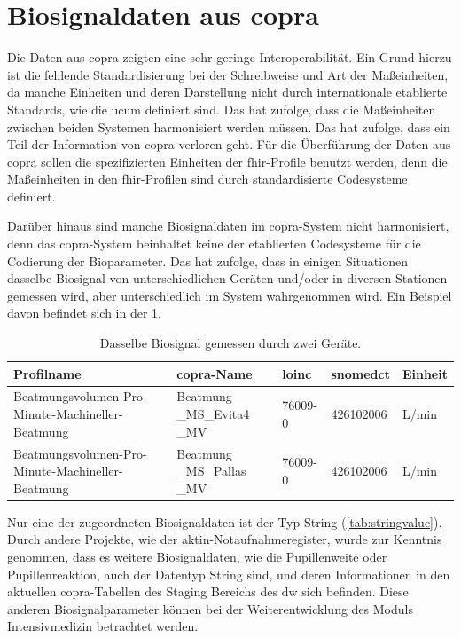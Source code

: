 \section{Biosignaldaten aus \acs{copra}} \label{sec:configvarcopradiscu}

Die Daten aus \ac{copra} zeigten eine sehr geringe Interoperabilität. Ein Grund hierzu ist die fehlende Standardisierung bei der Schreibweise und Art der Maßeinheiten, da manche Einheiten und deren Darstellung nicht durch internationale etablierte Standards, wie die \ac{ucum} definiert sind. Das hat zufolge, dass die Maßeinheiten zwischen beiden Systemen harmonisiert werden müssen. Das hat zufolge, dass ein Teil der Information von \ac{copra} verloren geht. Für die Überführung der Daten aus \ac{copra} sollen die spezifizierten Einheiten der \ac{fhir}-Profile benutzt werden, denn die Maßeinheiten in den \ac{fhir}-Profilen sind durch standardisierte Codesysteme definiert.

Darüber hinaus sind manche Biosignaldaten im \ac{copra}-System nicht harmonisiert, denn das \ac{copra}-System beinhaltet keine der etablierten Codesysteme für die Codierung der Bioparameter. Das hat zufolge, dass in einigen Situationen dasselbe Biosignal von unterschiedlichen Geräten und/oder in diversen Stationen gemessen wird, aber unterschiedlich im System wahrgenommen wird. Ein Beispiel davon befindet sich in der  \ref{tab:sameprofilbiosig}.

\clearpage

 \begin{table}[ht]
 	\centering 
 	\caption[Dasselbe Biosignal gemessen durch zwei Geräte]{Dasselbe Biosignal gemessen durch zwei Geräte.}
 	\label{tab:sameprofilbiosig}
 	\begin{tabular}{|p{3.5cm}|p{2.4cm}|l|l|l|}
 		\hline
 		 \bfseries Profilname & \bfseries \ac{copra}-Name & \bfseries \acs{loinc} & \bfseries \ac{snomedct} & \bfseries Einheit \\ \hline
 		Beatmungsvolumen-Pro-Minute-Machineller-Beatmung & Beatmung \_MS\_Evita4 \_MV & 76009-0 & 426102006 & L/min \\ \hline
 		Beatmungsvolumen-Pro-Minute-Machineller-Beatmung & Beatmung \_MS\_Pallas \_MV & 76009-0 & 426102006 & L/min \\ \hline
 	\end{tabular}
 \end{table}

Nur eine der zugeordneten Biosignaldaten ist der Typ String (\ref{tab:stringvalue}). Durch andere Projekte, wie der \ac{aktin}-Notaufnahmeregister, wurde zur Kenntnis genommen, dass es weitere Biosignaldaten, wie die Pupillenweite oder Pupillenreaktion, auch der Datentyp String sind, und deren Informationen in den aktuellen \ac{copra}-Tabellen des Staging Bereichs des \ac{dw} sich befinden. Diese anderen Biosignalparameter können bei der Weiterentwicklung des Moduls \glqq Intensivmedizin\grqq{} betrachtet werden.

